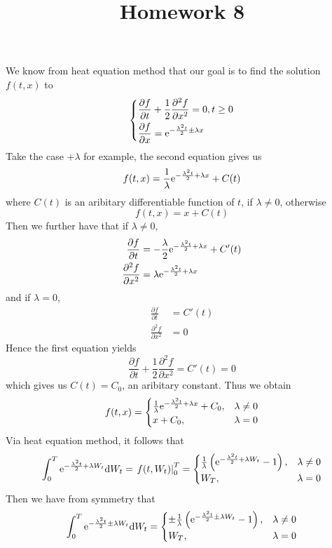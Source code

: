 \documentclass{homework}
\title{Homework 8}
\begin{document}
    \maketitle

    \problem
    \begin{subproblem}[(\alph*)]
        \item
        We know from heat equation method that
        our goal is to find the solution $f(t,x)$ to
        \[\left\{\begin{aligned}
            &\frac{\partial f}{\partial t}+\frac{1}{2}\frac{\partial^2 f}{\partial x^2}=0,t\geq 0\\
            &\frac{\partial f}{\partial x}=\mathrm e^{-\frac{\lambda^2t}{2}\pm\lambda x}\\
        \end{aligned}\right.\]
        Take the case $+\lambda$ for example, the second equation gives
        us
        \[f(t,x)=\frac{1}{\lambda}\mathrm e^{-\frac{\lambda^2t}{2}+\lambda x}+C(t)\]
        where $C(t)$ is an aribitary differentiable function of $t$, if $\lambda\neq 0$, otherwise
        \[f(t,x)=x+C(t)\]
        Then we further have that if $\lambda\neq 0$,
        \[\begin{aligned}
            \frac{\partial f}{\partial t}
            &=-\frac{\lambda}{2}\mathrm e^{-\frac{\lambda^2t}{2}+\lambda x}+C'(t)\\
            \frac{\partial^2 f}{\partial x^2}
            &=\lambda\mathrm e^{-\frac{\lambda^2t}{2}+\lambda x}
        \end{aligned}\]
        and if $\lambda=0$,
        \[\begin{aligned}
            \frac{\partial f}{\partial t}
            &=C'(t)\\
            \frac{\partial^2 f}{\partial x^2}
            &=0
        \end{aligned}\]
        Hence the first equation yields
        \[\frac{\partial f}{\partial t}+\frac{1}{2}\frac{\partial^2 f}{\partial x^2}
        =C'(t)=0\]
        which gives us $C(t)=C_0$, an aribitary constant.
        Thus we obtain
        \[f(t,x)=\begin{cases}
            \frac{1}{\lambda}\mathrm e^{-\frac{\lambda^2t}{2}+\lambda x}+C_0,&\lambda\neq 0\\
            x+C_0,&\lambda=0
        \end{cases}\]
        Via heat equation method, it follows that
        \[\int_0^T\mathrm e^{-\frac{\lambda^2t}{2}+\lambda W_t}\mathrm d W_t
        =\left.f(t,W_t)\right|_0^T
        =\begin{cases}
        \frac{1}{\lambda}\left(\mathrm e^{-\frac{\lambda^2t}{2}+\lambda W_t}-1\right),&\lambda\neq 0\\
        W_T,&\lambda=0
        \end{cases}\]
        Then we have from symmetry that
        \[\int_0^T\mathrm e^{-\frac{\lambda^2t}{2}\pm\lambda W_t}\mathrm d W_t
        =\begin{cases}
        \pm\frac{1}{\lambda}\left(\mathrm e^{-\frac{\lambda^2t}{2}\pm\lambda W_t}-1\right),&\lambda\neq 0\\
        W_T,&\lambda=0
        \end{cases}\]
        

\end{subproblem}
\end{document}
